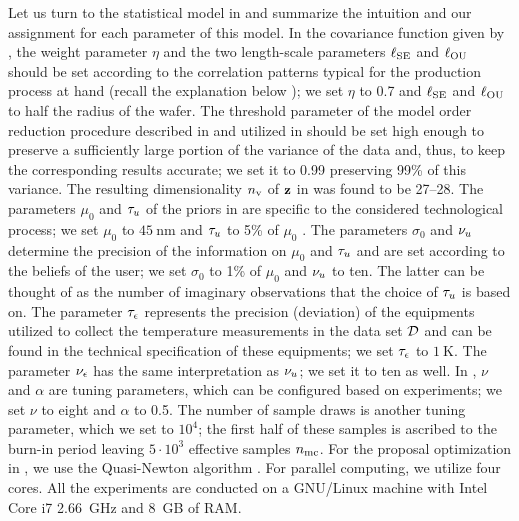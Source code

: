 Let us turn to the statistical model in  and summarize the intuition and our assignment for each parameter of this model.
In the covariance function given by , the weight parameter $\eta$ and the two length-scale parameters $\ell_{\text{SE}}$ and $\ell_{\text{OU}}$ should be set according to the correlation patterns typical for the production process at hand \cite{chandrakasan2001, cheng2011} (recall the explanation below ); we set $\eta$ to 0.7 and $\ell_{\text{SE}}$ and $\ell_{\text{OU}}$ to half the radius of the wafer.
The threshold parameter of the model order reduction procedure described in  and utilized in  should be set high enough to preserve a sufficiently large portion of the variance of the data and, thus, to keep the corresponding results accurate; we set it to 0.99 preserving 99\% of this variance. The resulting dimensionality ${n_\text{v}}$ of $\mathbf{z}$ in  was found to be 27--28.
The parameters $\mu_0$ and $\tau_u$ of the priors in  are specific to the considered technological process; we set $\mu_0$ to $45~\text{nm}$ and $\tau_u$ to 5\% of $\mu_0$ \cite{juan2011, juan2012}.
The parameters $\sigma_0$ and $\nu_u$ determine the precision of the information on $\mu_0$ and $\tau_u$ and are set according to the beliefs of the user; we set $\sigma_0$ to 1\% of $\mu_0$ and $\nu_u$ to ten.
The latter can be thought of as the number of imaginary observations that the choice of $\tau_u$ is based on.
The parameter $\tau_\epsilon$ represents the precision (deviation) of the equipments utilized to collect the temperature measurements in the data set $\mathcal{D}$ and can be found in the technical specification of these equipments; we set $\tau_\epsilon$ to $1~\text{K}$. The parameter $\nu_\epsilon$ has the same interpretation as $\nu_u$; we set it to ten as well.
In , $\nu$ and $\alpha$ are tuning parameters, which can be configured based on experiments; we set $\nu$ to eight and $\alpha$ to 0.5.
The number of sample draws is another tuning parameter, which we set to $10^4$; the first half of these samples is ascribed to the burn-in period leaving $5 \cdot 10^3$ effective samples ${n_\text{mc}}$.
For the proposal optimization in , we use the Quasi-Newton algorithm \cite{press2007}.
For parallel computing, we utilize four cores.
All the experiments are conducted on a GNU/Linux machine with Intel Core i7 2.66~GHz and 8~GB of RAM.

